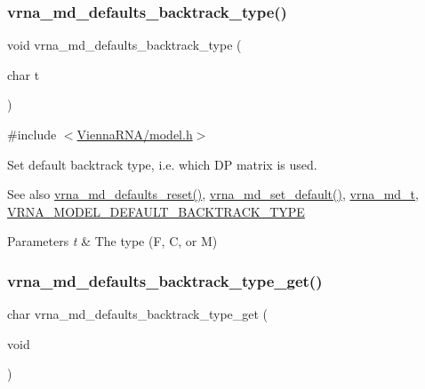 \subsubsection{\texorpdfstring{vrna\+\_\+md\+\_\+defaults\+\_\+backtrack\+\_\+type()}{vrna\_md\_defaults\_backtrack\_type()}}
{\footnotesize\ttfamily void vrna\+\_\+md\+\_\+defaults\+\_\+backtrack\+\_\+type (\begin{DoxyParamCaption}\item[{char}]{t }\end{DoxyParamCaption})}



{\ttfamily \#include $<$\mbox{\hyperlink{model_8h}{Vienna\+R\+N\+A/model.\+h}}$>$}



Set default backtrack type, i.\+e. which DP matrix is used. 

\begin{DoxySeeAlso}{See also}
\mbox{\hyperlink{group__model__details_ga70834424cf804d149937de89f80ceb45}{vrna\+\_\+md\+\_\+defaults\+\_\+reset()}}, \mbox{\hyperlink{group__model__details_ga8ac6ff84936282436f822644bf841f66}{vrna\+\_\+md\+\_\+set\+\_\+default()}}, \mbox{\hyperlink{group__model__details_ga1f8a10e12a0a1915f2a4eff0b28ea17c}{vrna\+\_\+md\+\_\+t}}, \mbox{\hyperlink{group__model__details_gad0e81fcaca53c4a826c68e0796de2afb}{V\+R\+N\+A\+\_\+\+M\+O\+D\+E\+L\+\_\+\+D\+E\+F\+A\+U\+L\+T\+\_\+\+B\+A\+C\+K\+T\+R\+A\+C\+K\+\_\+\+T\+Y\+PE}} 
\end{DoxySeeAlso}

\begin{DoxyParams}{Parameters}
{\em t} & The type (\textquotesingle{}F\textquotesingle{}, \textquotesingle{}C\textquotesingle{}, or \textquotesingle{}M\textquotesingle{}) \\
\hline
\end{DoxyParams}
\mbox{\label{group__model__details_ga1425b4ebd0e034dead66d79becd64143}} 
\subsubsection{\texorpdfstring{vrna\+\_\+md\+\_\+defaults\+\_\+backtrack\+\_\+type\+\_\+get()}{vrna\_md\_defaults\_backtrack\_type\_get()}}
{\footnotesize\ttfamily char vrna\+\_\+md\+\_\+defaults\+\_\+backtrack\+\_\+type\+\_\+get (\begin{DoxyParamCaption}\item[{void}]{ }\end{DoxyParamCaption})}



